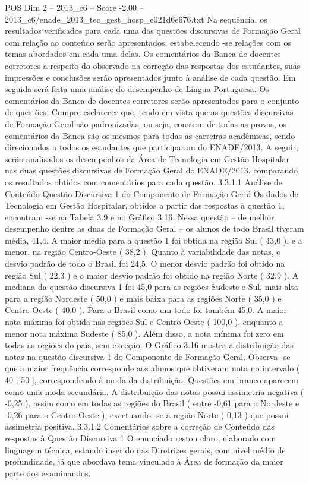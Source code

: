 \begin{textsample}{POS Dim 2 – 2013\_c6 – Score -2.00 – 2013\_c6/enade\_2013\_tec\_gest\_hosp\_e021d6e676.txt}
Na sequência, os resultados verificados para cada uma das questões discursivas de Formação Geral com relação ao conteúdo serão apresentados, estabelecendo -se relações com os temas abordados em cada uma delas.
Os comentários da Banca de docentes corretores a respeito do observado na correção das respostas dos estudantes, suas impressões e conclusões serão apresentados junto à análise de cada questão.
Em seguida será feita uma análise do desempenho de Língua Portuguesa.
Os comentários da Banca de docentes corretores serão apresentados para o conjunto de questões.
Cumpre esclarecer que, tendo em vista que as questões discursivas de Formação Geral são padronizadas, ou seja, constam de todas as provas, os comentários da Banca são os mesmos para todas as carreiras acadêmicas, sendo direcionados a todos os estudantes que participaram do ENADE/2013.
A seguir, serão analisados os desempenhos da Área de Tecnologia em Gestão Hospitalar nas duas questões discursivas de Formação Geral do ENADE/2013, comparando os resultados obtidos com comentários para cada questão. 3.3.1.1 Análise de Conteúdo Questão Discursiva 1 do Componente de Formação Geral Os dados de Tecnologia em Gestão Hospitalar, obtidos a partir das respostas à questão 1, encontram -se na Tabela 3.9 e no Gráfico 3.16.
Nessa questão – de melhor desempenho dentre as duas de Formação Geral – os alunos de todo Brasil tiveram média, 41,4.
A maior média para a questão 1 foi obtida na região Sul ( 43,0 ), e a menor, na região Centro-Oeste ( 38,2 ).
Quanto à variabilidade das notas, o desvio padrão de todo o Brasil foi 24,5.
O menor desvio padrão foi obtido na região Sul ( 22,3 ) e o maior desvio padrão foi obtido na região Norte ( 32,9 ).
A mediana da questão discursiva 1 foi 45,0 para as regiões Sudeste e Sul, mais alta para a região Nordeste ( 50,0 ) e mais baixa para as regiões Norte ( 35,0 ) e Centro-Oeste ( 40,0 ).
Para o Brasil como um todo foi também 45,0.
A maior nota máxima foi obtida nas regiões Sul e Centro-Oeste ( 100,0 ), enquanto a menor nota máxima Sudeste ( 85,0 ).
Além disso, a nota mínima foi zero em todas as regiões do país, sem exceção.
O Gráfico 3.16 mostra a distribuição das notas na questão discursiva 1 do Componente de Formação Geral.
Observa -se que a maior frequência corresponde aos alunos que obtiveram nota no intervalo ( 40 ; 50 ], correspondendo à moda da distribuição.
Questões em branco aparecem como uma moda secundária.
A distribuição das notas possui assimetria negativa ( -0,25 ), assim como em todas as regiões do Brasil ( entre -0,61 para o Nordeste e -0,26 para o Centro-Oeste ), excetuando -se a região Norte ( 0,13 ) que possui assimetria positiva. 3.3.1.2 Comentários sobre a correção de Conteúdo das respostas à Questão Discursiva 1 O enunciado restou claro, elaborado com linguagem técnica, estando inserido nas Diretrizes gerais, com nível médio de profundidade, já que abordava tema vinculado à Área de formação da maior parte dos examinandos.

\end{textsample}
